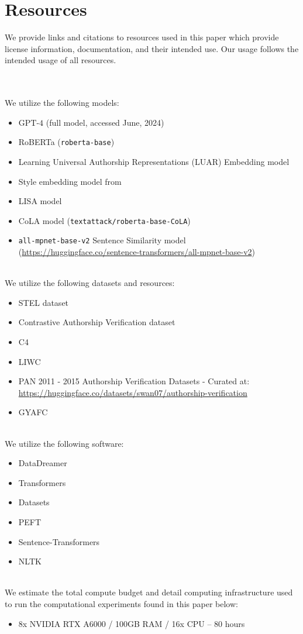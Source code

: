 \newpage
\section{Resources}
\label{sec:appendix:resources}

\noindent We provide links and citations to resources used in this paper which provide license information, documentation, and their intended use. Our usage follows the intended usage of all resources.

~\\ ~\\ \noindent We utilize the following models:
\begin{itemize}
    \small
    \item $\text{GPT-4}$ (full model, accessed June, 2024) \citep{gpt4}
    \item RoBERTa (\texttt{roberta-base}) \citep{roberta,bert,sentencetransformers}
    \item Learning Universal Authorship Representations (LUAR) Embedding model \citep{luar}
    \item Style embedding model from \citet{styleemb}
    \item LISA model \citep{lisa}
    \item CoLA model (\texttt{textattack/roberta-base-CoLA}) \citep{cola}
    \item \texttt{all-mpnet-base-v2} Sentence Similarity model \citep{sentencetransformers} ~ (\url{https://huggingface.co/sentence-transformers/all-mpnet-base-v2})
\end{itemize}

~\\ \noindent We utilize the following datasets and resources:
\begin{itemize}
    \small
    \item STEL dataset \citep{stel}
    \item Contrastive Authorship Verification dataset \citep{styleemb}
    \item C4 \citep{t5andc4}
    \item LIWC \citep{liwc}
    \item PAN 2011 - 2015 Authorship Verification Datasets \citep{pan11,pan13,pan14,pan15} - Curated at: \url{https://huggingface.co/datasets/swan07/authorship-verification}
    \item GYAFC \citep{gyafc}
\end{itemize}

~\\ \noindent We utilize the following software:
\begin{itemize}
    \small
    \item DataDreamer \citep{datadreamer}
    \item Transformers \citep{transformers}
    \item Datasets \citep{datasets}
    \item PEFT \citep{peft}
    \item Sentence-Transformers \citep{sentencetransformers}
    \item NLTK \citep{nltk}
\end{itemize}

~\\ \noindent We estimate the total compute budget and detail computing infrastructure used to run the computational experiments found in this paper below:
\begin{itemize}
    \small
    \item 8x NVIDIA RTX A6000 / 100GB RAM / 16x CPU -- 80 hours
\end{itemize}